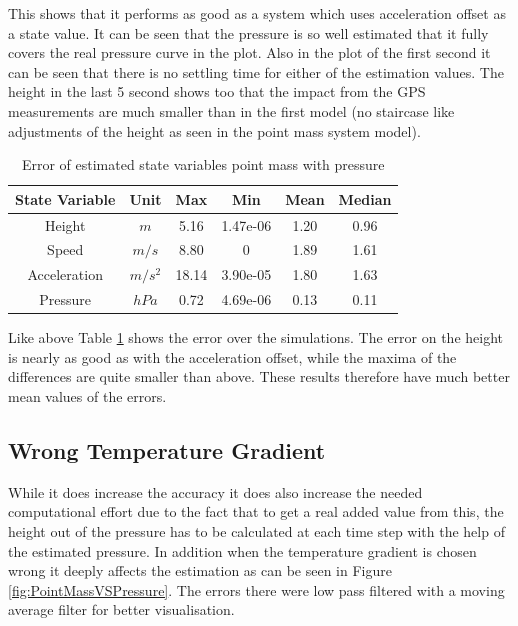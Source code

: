 This shows that it performs as good as a system which uses acceleration offset as a state value.
It can be seen that the pressure is so well estimated that it fully covers the real pressure curve in the plot.
Also in the plot of the first second it can be seen that there is no settling time for either of the estimation values.
The height in the last 5 second shows too that the impact from the GPS measurements are much smaller than in the first model (no staircase like adjustments of the height as seen in the point mass system model).

\begin{table}[h!]
\centering
\begin{tabular}{cccccc}
\hline
\multicolumn{1}{|c|}{State Variable} & \multicolumn{1}{c|}{Unit} & \multicolumn{1}{c|}{Max} & \multicolumn{1}{c|}{Min} & \multicolumn{1}{c|}{Mean} & \multicolumn{1}{c|}{Median} \\ \hline
Height                            & $m$                         & 5.16                   & 1.47e-06                 & 1.20                    & 0.96                      \\
Speed                             & $m/s$                       & 8.80                   & 0                        & 1.89                    & 1.61                      \\
Acceleration                      & $m/s^2$   			& 18.14                  & 3.90e-05                 & 1.80                    & 1.63                      \\
Pressure                  	  & $hPa$   			& 0.72                   & 4.69e-06                 & 0.13                    & 0.11
\end{tabular}
\caption{Error of estimated state variables point mass with pressure}
\label{tab:ErrorPointMassPressure}
\end{table}

Like above Table \ref{tab:ErrorPointMassPressure} shows the error over the simulations.
The error on the height is nearly as good as with the acceleration offset, while the maxima of the differences are quite smaller than above.
These results therefore have much better mean values of the errors.

\subsection{Wrong Temperature Gradient}
While it does increase the accuracy it does also increase the needed computational effort due to the fact that to get a real added value from this,
the height out of the pressure has to be calculated at each time step with the help of the estimated pressure.
In addition when the temperature gradient is chosen wrong it deeply affects the estimation as can be seen in Figure \ref{fig:PointMassVSPressure}.
The errors there were low pass filtered with a moving average filter for better visualisation.


